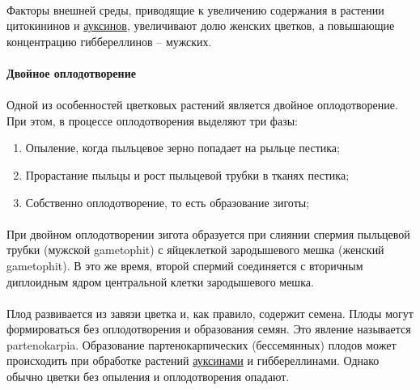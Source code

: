 \paragraph*{}Факторы внешней среды, приводящие к увеличению содержания в растении цитокининов и \hyperlink{auxsin}{ауксинов}, увеличивают долю женских цветков, а повышающие концентрацию гиббереллинов -- мужских.

\paragraph*{Двойное оплодотворение}

\paragraph*{}Одной из особенностей цветковых растений является двойное оплодотворение. При этом, в процессе оплодотворения выделяют три фазы:

\begin{enumerate}
	\item Опыление, когда пыльцевое зерно попадает на рыльце пестика;
	\item Прорастание пыльцы и рост пыльцевой трубки в тканях пестика;
	\item Собственно оплодотворение, то есть образование зиготы;
\end{enumerate}

\paragraph*{}При двойном оплодотворении зигота образуется при слиянии спермия пыльцевой трубки (мужской \gls{gametophit}) с яйцеклеткой зародышевого мешка (женский \gls{gametophit}). В это же время, второй спермий соединяется с вторичным диплоидным ядром центральной клетки зародышевого мешка. 

\paragraph*{}Плод развивается из завязи цветка и, как правило, содержит семена. Плоды могут формироваться без оплодотворения и образования семян. Это явление называется \gls{partenokarpia}. Образование партенокарпических (бессемянных) плодов может происходить при обработке растений \hyperlink{auxsin}{ауксинами} и гиббереллинами. Однако обычно цветки без опыления и оплодотворения опадают.

